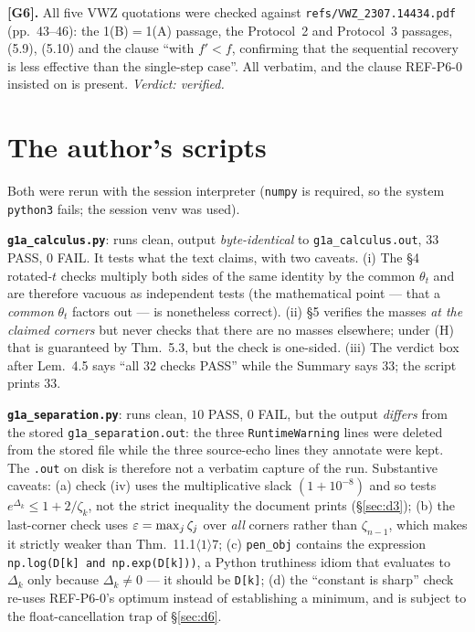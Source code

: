 \documentclass[11pt]{article}
\theoremstyle{definition}\newtheorem{example}[theorem]{Example}
\begin{document}
\textbf{[G6].}  All five VWZ quotations were checked against
\texttt{refs/VWZ\_2307.14434.pdf} (pp.~43--46): the 1(B)$=$1(A) passage, the Protocol~2
and Protocol~3 passages, (5.9), (5.10) and the clause ``with $f'<f$, confirming that the
sequential recovery is less effective than the single-step case''.  All verbatim, and the
clause REF-P6-0 insisted on is present.  \emph{Verdict: verified.}

\section{The author's scripts}\label{sec:scripts}

Both were rerun with the session interpreter (\texttt{numpy} is required, so the system
\texttt{python3} fails; the session venv was used).

\textbf{\texttt{g1a\_calculus.py}}: runs clean, output \emph{byte-identical} to
\texttt{g1a\_calculus.out}, $33$ PASS, $0$ FAIL.  It tests what the text claims, with two
caveats.  (i) The \S4 rotated-$t$ checks multiply both sides of the same identity by the
common $\theta_t$ and are therefore vacuous as independent tests (the mathematical point
--- that a \emph{common} $\theta_t$ factors out --- is nonetheless correct).  (ii) \S5
verifies the masses \emph{at the claimed corners} but never checks that there are no
masses elsewhere; under (H) that is guaranteed by Thm.~5.3, but the check is one-sided.
(iii) The verdict box after Lem.~4.5 says ``all $32$ checks PASS'' while the Summary says
$33$; the script prints $33$.

\textbf{\texttt{g1a\_separation.py}}: runs clean, $10$ PASS, $0$ FAIL, but the output
\emph{differs} from the stored \texttt{g1a\_separation.out}: the three
\texttt{RuntimeWarning} lines were deleted from the stored file while the three
source-echo lines they annotate were kept.  The \texttt{.out} on disk is therefore not a
verbatim capture of the run.  Substantive caveats: (a) check (iv) uses the multiplicative
slack $(1+10^{-8})$ and so tests $e^{\Delta_k}\le1+2/\zeta_k$, not the strict inequality
the document prints (\S\ref{sec:d3}); (b) the last-corner check uses
$\varepsilon=\max_j\zeta_j$ over \emph{all} corners rather than $\zeta_{n-1}$, which makes it
strictly weaker than Thm.~11.1$\langle1\rangle7$; (c) \texttt{pen\_obj} contains the
expression \texttt{np.log(D[k] and np.exp(D[k]))}, a Python truthiness idiom that
evaluates to $\Delta_k$ only because $\Delta_k\neq0$ --- it should be \texttt{D[k]};
(d) the ``constant is sharp'' check re-uses REF-P6-0's optimum instead of establishing a
minimum, and is subject to the float-cancellation trap of \S\ref{sec:d6}.
\end{document}
